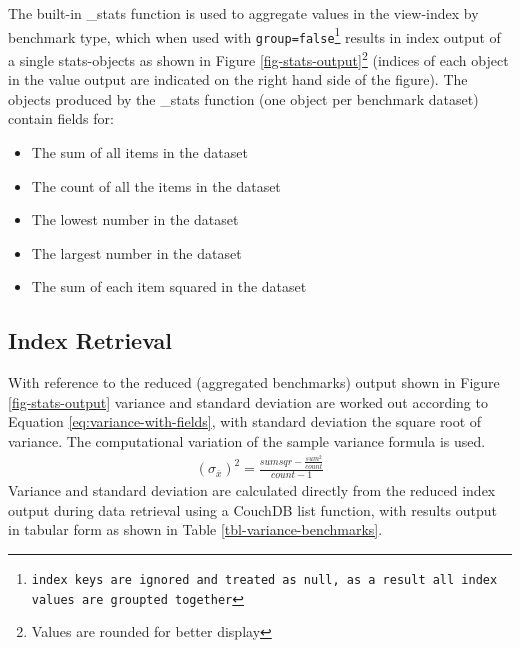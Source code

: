 The built-in \_stats function is used to aggregate values in the view-index by benchmark type, which when used with \texttt{group=false\footnote{index keys are ignored and treated as \texttt{null}, as a result all index values are groupted together}} results in index output of a single stats-objects as shown in Figure \ref{fig-stats-output}\footnote{Values are rounded for better display} (indices of each object in the value output are indicated on the right hand side of the figure). The objects produced by the \_stats function (one object per benchmark dataset) contain fields for:

\begin{itemize}
    \item The sum of all items in the dataset
    \item The count of all the items in the dataset
    \item The lowest number in the dataset
    \item The largest number in the dataset
    \item The sum of each item squared in the dataset
\end{itemize}



\subsection{Index Retrieval}
With reference to the reduced (aggregated benchmarks) output shown in Figure \ref{fig-stats-output} variance and standard deviation are worked out according to Equation \ref{eq:variance-with-fields}, with standard deviation the square root of variance. The computational variation of the sample variance formula is used.
\begin{align}
    (\sigma_{\overline{x}})^{2} =  \frac{sumsqr - \frac{sum^2}{count}}{count - 1}\label{eq:variance-with-fields}
\end{align}
Variance and standard deviation are calculated directly from the reduced index output during data retrieval using a CouchDB list function, with results output in tabular form as shown in Table \ref{tbl-variance-benchmarks}.